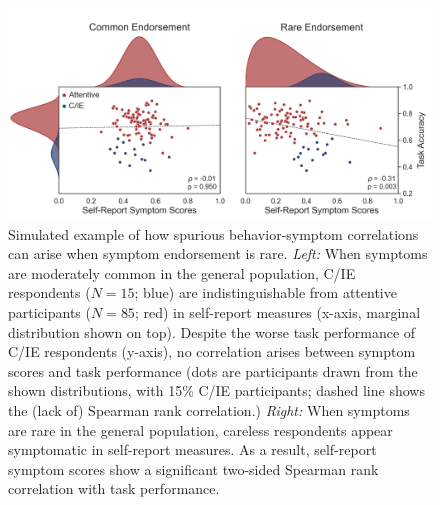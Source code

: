 \documentclass[a4paper,notitlepage,12pt]{article}
\begin{document}
\begin{refsection}[main]
\begin{figure}[h]
    \includegraphics[width=16cm]{../figures/main_01.png}
    \centering
    \captionsetup{width=0.88\textwidth}
    \caption{Simulated example of how spurious behavior-symptom correlations can arise when symptom endorsement is rare. \textit{Left:} When symptoms are moderately common in the general population, C/IE respondents ($N=15$; blue) are indistinguishable from attentive participants ($N=85$; red) in self-report measures (x-axis, marginal distribution shown on top). Despite the worse task performance of C/IE respondents (y-axis), no correlation arises between symptom scores and task performance (dots are participants drawn from the shown distributions, with 15\% C/IE participants; dashed line shows the (lack of) Spearman rank correlation.) \textit{Right:} When symptoms are rare in the general population, careless respondents appear symptomatic in self-report measures. As a result, self-report symptom scores show a significant two-sided Spearman rank correlation with task performance. }
    \label{fig:simulation}
\end{figure}


\end{refsection}
\end{document}
